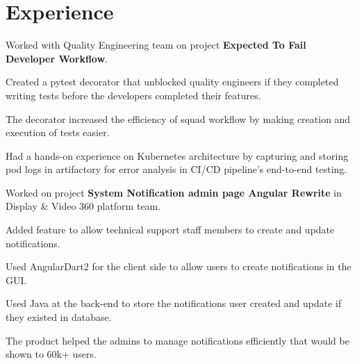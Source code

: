 \documentclass[]{deedy-resume-reversed}
\begin{document}
%
%

%
%

%
%

\begin{minipage}[t]{0.60\textwidth}


\section{Experience}

\vspace{\topsep} %
\begin{tightemize}
\item Worked with Quality Engineering team on project \textbf{Expected To Fail Developer Workflow}.
\item Created a pytest decorator that unblocked quality engineers if they completed writing tests before the developers completed their features.
\item The decorator increased the efficiency of squad workflow by making creation and execution of tests easier.
\item Had a hands-on experience on Kubernetes architecture by capturing and storing pod logs in artifactory for error analysis in CI/CD pipeline's end-to-end testing.
\end{tightemize}
\sectionsep

\vspace{\topsep} %
\begin{tightemize}
\item Worked on project \textbf{System Notification admin page Angular Rewrite} in Display &  Video 360 platform team.
\item Added feature to allow technical support staff members to create and update notifications.
\item Used AngularDart2 for the client side to allow users to create notifications in the GUI.
\item Used Java at the back-end to store the notifications user created and update if they existed in database.
\item The product helped the admins to manage notifications efficiently that would be shown to 60k+ users.
\end{tightemize}
\sectionsep


\end{minipage}
\end{document}
